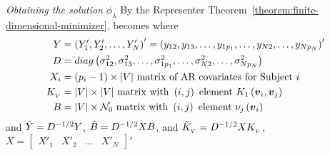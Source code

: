 \begin{frame}{\textit{Obtaining the solution}  $\phi_\lambda$}
\footnotesize
By the Representer Theorem~\ref{theorem:finite-dimensional-minimizer}, \nt{\eqref{eq:phi-penalized-sums-of-squares}} becomes
\footnotesize
where
\begin{align*}%
Y&= \left( Y'_1, Y'_2, \dots, Y'_{N} \right)' = \left( y_{12}, y_{13},\dots, y_{1p_1}, \dots, y_{N2},\dots, y_{Np_N} \right)'\\
D &= diag\left( \sigma^2_{12}, \sigma^2_{13},\dots, \sigma^2_{1p_1}, \dots,\sigma^2_{N2},\dots, \sigma^2_{Np_N}  \right)\\
X_i &= \left(p_i-1\right) \times \vert V \vert \mbox{ matrix of AR covariates for Subject }i \\
K_{_{ V}} &= \vert V \vert \times \vert V \vert \mbox{ matrix with } \left(i,j\right) \mbox{ element } K_1\left(\bfv_i, \bfv_j\right)\\
B &= \vert V \vert \times \mathcal{N}_0 \mbox{ matrix with } \left(i,j\right) \mbox{ element } \nu_j\left(\bfv_i\right)
\end{align*} \footnotesize
and $\tilde{Y} = D^{-1/2} Y$, $\tilde{B} = D^{-1/2} X B $, and $\tilde{K}_{_{ V}} = D^{-1/2} X K_{_{ V}}$, $X = \begin{bmatrix} X'_1 & X'_2 & \dots & X'_N \end{bmatrix}'$ 
\end{frame}




